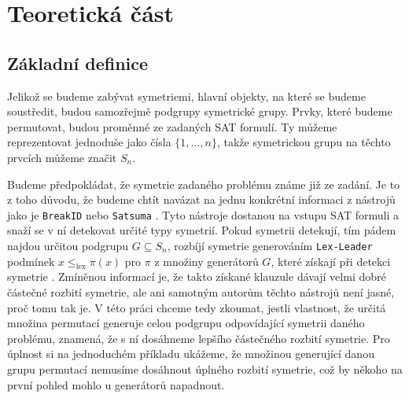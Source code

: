 
\chapter{Teoretická část}


\section{Základní definice}

Jelikož se budeme zabývat symetriemi, hlavní objekty, na které se budeme soustředit, budou samozřejmě podgrupy symetrické grupy. Prvky, které budeme permutovat, budou proměnné ze zadaných SAT formulí. Ty můžeme reprezentovat jednoduše jako čísla $\{1,...,n\}$, takže symetrickou grupu na těchto prvcích můžeme značit $S_n$.

Budeme předpokládat, že symetrie zadaného problému známe již ze zadání. Je to z toho důvodu, že budeme chtít navázat na jednu konkrétní informaci z nástrojů jako je \texttt{BreakID} nebo \texttt{Satsuma} \cite{DBLP:journals/corr/abs-2406-13557}\cite{devriendt2016breakidstaticsymmetrybreaking}. Tyto nástroje dostanou na vstupu SAT formuli a snaží se v ní detekovat určité typy symetrií. Pokud symetrii detekují, tím pádem najdou určitou podgrupu $G \subseteq S_n$, rozbíjí symetrie generováním \texttt{Lex-Leader} podmínek $x \leq_{\text{lex}} \pi(x)$ pro $\pi$ z množiny generátorů $G$, které získají při detekci symetrie \cite{DBLP:journals/corr/abs-2406-13557}\cite{devriendt2016breakidstaticsymmetrybreaking}. Zmíněnou informací je, že takto získané klauzule dávají velmi dobré částečné rozbití symetrie, ale ani samotným autorům těchto nástrojů není jasné, proč tomu tak je. V této práci chceme tedy zkoumat, jestli vlastnost, že určitá množina permutací generuje celou podgrupu odpovídající symetrii daného problému, znamená, že s ní dosáhneme lepšího částečného rozbití symetrie. Pro úplnost si na jednoduchém příkladu ukážeme, že množinou generující danou grupu permutací nemusíme dosáhnout úplného rozbití symetrie, což by někoho na první pohled mohlo u generátorů napadnout.


